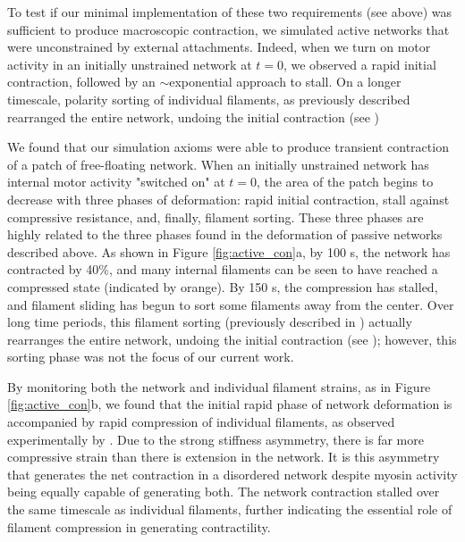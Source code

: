 \documentclass[10pt,letterpaper]{article}
\begin{document}
To test if our minimal implementation of these two requirements (see above) was sufficient to produce macroscopic contraction, we simulated active networks that were unconstrained by external attachments.
Indeed, when we turn on motor activity in an initially unstrained network at $t=0$, we observed a rapid initial contraction, followed by an $\sim$exponential approach to stall.  On a longer timescale, polarity sorting of individual filaments, as previously described  \cite{Ndlec:1997aa,Surrey1167} rearranged the entire network, undoing the initial contraction (see )


We found that our simulation axioms were able to produce transient contraction of a patch of free-floating network.  When an initially unstrained network has internal motor activity "switched on" at $t=0$, the area of the patch begins to decrease with three phases of deformation:  rapid initial contraction, stall against compressive resistance, and, finally, filament sorting.  These three phases are highly related to the three phases found in the deformation of passive networks described above. As shown in Figure \ref{fig:active_con}a, by 100 s, the network has contracted by 40\%, and many internal filaments can be seen to have reached a compressed state (indicated by orange).  By 150 s, the compression has stalled, and filament sliding has begun to sort some filaments away from the center. Over long time periods, this filament sorting (previously described in \cite{Ndlec:1997aa,Surrey1167}) actually rearranges the entire network, undoing the initial contraction (see ); however, this sorting phase was not the focus of our current work.  


By monitoring both the network and individual filament strains, as in Figure \ref{fig:active_con}b, we found that the initial rapid phase of network deformation is accompanied by rapid compression of individual filaments, as observed experimentally by \cite{rheo_2D1}.  Due to the strong stiffness asymmetry, there is far more compressive strain than there is extension in the network. It is this asymmetry that generates the net contraction in a disordered network despite myosin activity being equally capable of generating both.  The network contraction stalled over the same timescale as individual filaments, further indicating the essential role of filament compression in generating contractility.  
\end{document}
